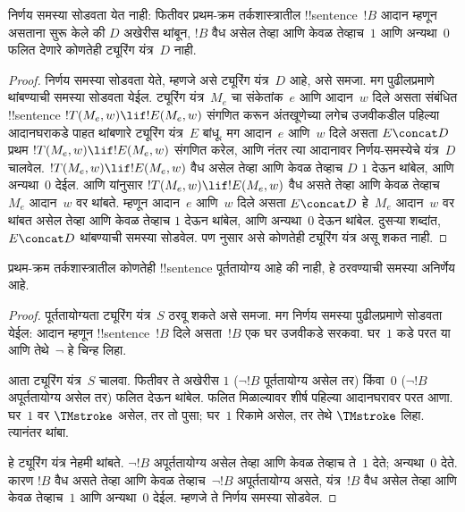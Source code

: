 \documentclass[../../../include/open-logic-section]{subfiles}
\begin{document}

\begin{thm}
निर्णय समस्या सोडवता येत नाही:
फितीवर प्रथम-क्रम तर्कशास्त्रातील
!!{sentence}~$!B$ आदान म्हणून
असताना सुरू केले की $D$ अखेरीस थांबून,
$!B$ वैध असेल तेव्हा आणि केवळ तेव्हाच~$1$ आणि
अन्यथा~$0$ फलित देणारे
कोणतेही ट्यूरिंग यंत्र~$D$ नाही.
\end{thm}

\begin{proof}
निर्णय समस्या सोडवता येते,
म्हणजे असे ट्यूरिंग यंत्र~$D$
आहे, असे समजा. मग पुढीलप्रमाणे
थांबण्याची समस्या सोडवता येईल.
ट्यूरिंग यंत्र~$M_e$ चा संकेतांक~$e$
आणि आदान~$w$ दिले असता
संबंधित !!{sentence}
$!T(M_e, w) \lif !E(M_e, w)$
संगणित करून अंतखूणेच्या लगेच उजवीकडील
पहिल्या आदानघराकडे पाहत थांबणारे
ट्यूरिंग यंत्र~$E$ बांधू.
%
मग आदान~$e$ आणि~$w$
दिले असता $E \concat D$
प्रथम $!T(M_e, w) \lif
!E(M_e, w)$ संगणित करेल,
आणि नंतर त्या आदानावर
निर्णय-समस्येचे यंत्र~$D$
चालवेल. $!T(M_e, w) \lif !E(M_e, w)$
वैध असेल तेव्हा आणि केवळ तेव्हाच $D$
$1$ देऊन थांबेल, आणि
अन्यथा~$0$ देईल.
आणि 
यांनुसार $!T(M_e, w) \lif !E(M_e, w)$
वैध असते तेव्हा आणि केवळ तेव्हाच~$M_e$
आदान~$w$ वर थांबते.
म्हणून आदान~$e$ आणि~$w$
दिले असता $E\concat D$
हे~$M_e$ आदान~$w$
वर थांबत असेल तेव्हा आणि केवळ तेव्हाच
$1$ देऊन थांबेल, आणि
अन्यथा~$0$ देऊन थांबेल.
दुसऱ्या शब्दांत, $E \concat D$
थांबण्याची समस्या सोडवेल.
पण 
नुसार असे कोणतेही
ट्यूरिंग यंत्र असू शकत नाही.
\end{proof}

\begin{cor}%
प्रथम-क्रम तर्कशास्त्रातील
कोणतेही !!{sentence}
पूर्ततायोग्य आहे की नाही,
हे ठरवण्याची समस्या अनिर्णेय आहे.
\end{cor}

\begin{proof}
  पूर्ततायोग्यता ट्यूरिंग यंत्र~$S$
  ठरवू शकते असे समजा. मग
  निर्णय समस्या पुढीलप्रमाणे
  सोडवता येईल: आदान म्हणून
  !!{sentence}~$!B$ दिले
  असता~$!B$ एक घर उजवीकडे
  सरकवा. घर~$1$ कडे परत
  या आणि तेथे~$\lnot$
  हे चिन्ह लिहा.
%

  आता ट्यूरिंग यंत्र~$S$
  चालवा. फितीवर ते अखेरीस
  $1$ ($\lnot !B$ पूर्ततायोग्य
  असेल तर) किंवा~$0$
  ($\lnot !B$ अपूर्ततायोग्य
  असेल तर) फलित देऊन
  थांबेल. फलित मिळाल्यावर शीर्ष पहिल्या
  आदानघरावर परत आणा. घर~$1$ वर
  $\TMstroke$ असेल, तर
  तो पुसा; घर~$1$
  रिकामे असेल, तर तेथे
  $\TMstroke$ लिहा.
  त्यानंतर थांबा.

  हे ट्यूरिंग यंत्र नेहमी
  थांबते. $\lnot
  !B$ अपूर्ततायोग्य असेल
  तेव्हा आणि केवळ तेव्हाच ते~$1$ देते;
  अन्यथा~$0$ देते.
  कारण $!B$ वैध असते
  तेव्हा आणि केवळ तेव्हाच~$\lnot !B$
  अपूर्ततायोग्य असते,
  यंत्र~$!B$ वैध असेल
  तेव्हा आणि केवळ तेव्हाच~$1$ आणि
  अन्यथा~$0$ देईल.
  म्हणजे ते निर्णय
  समस्या सोडवेल.
\end{proof}
\end{document}
